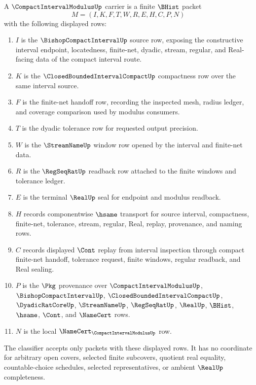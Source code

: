 \begin{definition}
\label{def:compact-interval-modulus-carrier}
A $\CompactIntervalModulusUp$ carrier is a finite $\BHist$ packet
$$
M=(I,K,F,T,W,R,E,H,C,P,N)
$$
with the following displayed rows:
\begin{enumerate}
\item $I$ is the $\BishopCompactIntervalUp$ source row, exposing the constructive interval endpoint, locatedness, finite-net, dyadic, stream, regular, and Real-facing data of the compact interval route.
\item $K$ is the $\ClosedBoundedIntervalCompactUp$ compactness row over the same interval source.
\item $F$ is the finite-net handoff row, recording the inspected mesh, radius ledger, and coverage comparison used by modulus consumers.
\item $T$ is the dyadic tolerance row for requested output precision.
\item $W$ is the $\StreamNameUp$ window row opened by the interval and finite-net data.
\item $R$ is the $\RegSeqRatUp$ readback row attached to the finite windows and tolerance ledger.
\item $E$ is the terminal $\RealUp$ seal for endpoint and modulus readback.
\item $H$ records componentwise $\hsame$ transport for source interval, compactness, finite-net, tolerance, stream, regular, Real, replay, provenance, and naming rows.
\item $C$ records displayed $\Cont$ replay from interval inspection through compact finite-net handoff, tolerance request, finite windows, regular readback, and Real sealing.
\item $P$ is the $\Pkg$ provenance over $\CompactIntervalModulusUp$, $\BishopCompactIntervalUp$, $\ClosedBoundedIntervalCompactUp$, $\DyadicRatCoreUp$, $\StreamNameUp$, $\RegSeqRatUp$, $\RealUp$, $\BHist$, $\hsame$, $\Cont$, and $\NameCert$ rows.
\item $N$ is the local $\NameCert_{\CompactIntervalModulusUp}$ row.
\end{enumerate}
The classifier accepts only packets with these displayed rows. It has no coordinate for arbitrary open covers, selected finite subcovers, quotient real equality, countable-choice schedules, selected representatives, or ambient $\RealUp$ completeness.
\end{definition}


